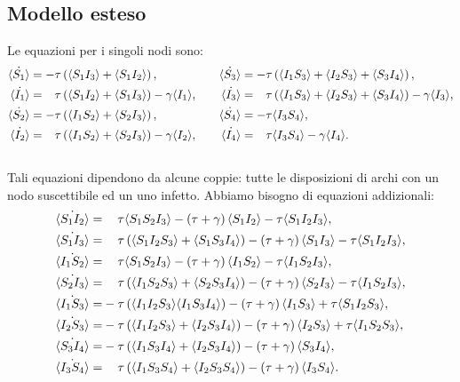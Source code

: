 \subsection{Modello esteso}
Le equazioni per i singoli nodi sono:
 \begin{equation*}
 \begin{aligned}
 \dot{\angol{S_1}}&= -\tau \tonde{ \angol{ S_1 I_3} + \angol{S_1 I_2}},  \quad 
 &\dot{\angol{S_3}}&= -\tau \tonde{ \angol{I_1 S_3} + \angol{I_2 S_3}+ \angol{S_3 I_4}},  \\
 \dot{\angol{I_1}}&= \spa \tau \tonde{ \angol{ S_1 I_2} + \angol{S_1 I_3}} - \gamma\angol{I_1},\quad 
 &\dot{\angol{I_3}}&= \spa \tau \tonde{ \angol{I_1 S_3} + \angol{I_2 S_3}+ \angol{S_3 I_4}}-\gamma\angol{I_3},\\
 \dot{\angol{S_2}}&= -\tau \tonde{ \angol{ I_1 S_2} + \angol{S_2 I_3}}, \quad &\dot{\angol{S_4}} &= -\tau \angol{I_3S_4},  \\
 \dot{\angol{I_2}}&= \spa \tau \tonde{ \angol{ I_1 S_2} + \angol{S_2 I_3}} - \gamma\angol{I_2},\quad & \dot{\angol{I_4}}&=\spa \tau\angol{I_3S_4}-\gamma\angol{I_4}. \\\
 \end{aligned}	
 \end{equation*}
 Tali equazioni dipendono da alcune coppie: tutte le disposizioni di archi con un nodo suscettibile ed un uno infetto. Abbiamo bisogno di equazioni addizionali:
 \begin{equation*}
 \begin{aligned}
 \dot{\angol{S_1I_2}} =&\spa \tau\angol{S_1S_2I_3} - \tonde{ \tau + \gamma} \angol{S_1 I_2} -\tau\angol{S_1I_2I_3},\\
 \dot{\angol{S_1I_3}}=&\spa \tau\tonde{ \angol{S_1I_2S_3} + \angol{S_1S_3I_4}} - \tonde{ \tau +\gamma}\angol{S_1 I_3} -\tau \angol{ S_1 I_2 I_3},\\
 \dot{\angol{I_1S_2}} =&\spa\tau\angol{S_1S_2I_3} - \tonde{ \tau + \gamma} \angol{I_1 S_2} -\tau\angol{I_1S_2I_3},\\
\dot{\angol{S_2I_3}} =&\spa \tau\tonde{\angol{I_1S_2S_3} +{\angol{S_2S_3I_4}}} - \tonde{ \tau + \gamma} \angol{S_2 I_3} -\tau\angol{I_1S_2I_3},\\
 \dot{\angol{I_1S_3}} =&- \tau\tonde{\angol{I_1I_2S_3} \angol{I_1S_3I_4}} - \tonde{ \tau + \gamma} \angol{I_1 S_3} +\tau\angol{S_1I_2S_3},\\ 
\dot{\angol{I_2S_3}} =&- \tau\tonde{\angol{I_1I_2S_3} +\angol{I_2S_3I_4}} - \tonde{ \tau + \gamma} \angol{I_2 S_3} +\tau\angol{I_1S_2S_3},\\ 
 \dot{\angol{S_3I_4}} =&- \tau\tonde{\angol{I_1S_3I_4}+\angol{I_2S_3I_4}} - \tonde{ \tau + \gamma} \angol{S_3 I_4}, \\ 
    \dot{\angol{I_3S_4}} =& \spa \tau\tonde{\angol{I_1S_3S_4}+\angol{I_2S_3S_4}} - \tonde{ \tau + \gamma} \angol{I_3 S_4}.\\ 
\end{aligned}
 \end{equation*}
